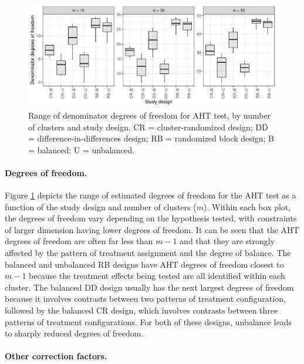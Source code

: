 \documentclass[12pt]{article}
\begin{document}
\begin{figure}

{\centering \includegraphics[width=\linewidth]{CR_fig/df-1} 

}

\caption{Range of denominator degrees of freedom for AHT test, by number of clusters and study design. CR = cluster-randomized design; DD = difference-in-differences design; RB = randomized block design; B = balanced; U = unbalanced.}\label{fig:df}
\end{figure}

\hypertarget{degrees-of-freedom.}{%
\paragraph{Degrees of freedom.}\label{degrees-of-freedom.}}

Figure \ref{fig:df} depicts the range of estimated degrees of freedom
for the AHT test as a function of the study design and number of
clusters (\(m\)). Within each box plot, the degrees of freedom vary
depending on the hypothesis tested, with constraints of larger dimension
having lower degrees of freedom. It can be seen that the AHT degrees of
freedom are often far less than \(m - 1\) and that they are strongly
affected by the pattern of treatment assignment and the degree of
balance. The balanced and unbalanced RB designs have AHT degrees of
freedom closest to \(m - 1\) because the treatment effects being tested
are all identified within each cluster. The balanced DD design usually
has the next largest degrees of freedom because it involves contrasts
between two patterns of treatment configuration, followed by the
balanced CR design, which involves contrasts between three patterns of
treatment configurations. For both of these designs, unbalance leads to
sharply reduced degrees of freedom.

\hypertarget{other-correction-factors.}{%
\paragraph{Other correction factors.}\label{other-correction-factors.}}
\end{document}
